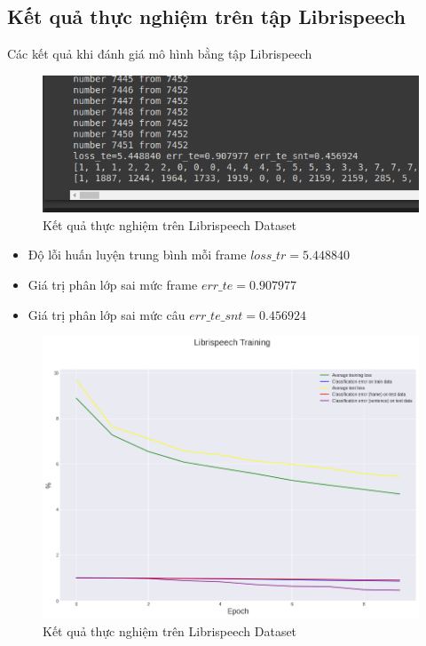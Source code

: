 \documentclass{article}
\begin{document}
	\subsection{Kết quả thực nghiệm trên tập Librispeech}
	Các kết quả khi đánh giá mô hình bằng tập Librispeech
	\begin{figure}[H]
		\centering
		\includegraphics[width=.75\textwidth]{result/evaluate_result_libris.png}
		\caption{Kết quả thực nghiệm trên Librispeech Dataset}
		\label{fig:writing-thesis}
	\end{figure}
	\begin{itemize}
		\item Độ lỗi huấn luyện trung bình mỗi frame $loss\_tr=5.448840$
		\item Giá trị phân lớp sai mức frame $err\_te=0.907977$
		\item Giá trị phân lớp sai mức câu $err\_te\_snt =0.456924$
	\end{itemize}
	\begin{figure}[H]
		\centering
		\includegraphics[width=.75\textwidth]{result/sincnet_librispeech_plot.png}
		\caption{Kết quả thực nghiệm trên Librispeech Dataset}
		\label{fig:writing-thesis}
	\end{figure}
\end{document}
